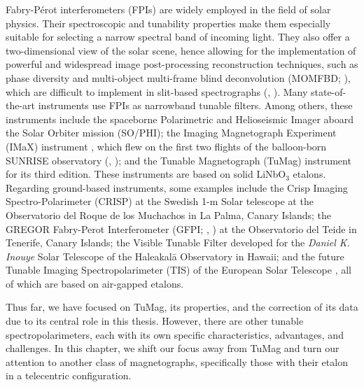 

Fabry-Pérot interferometers (FPIs) are widely employed in the field of solar physics. Their spectroscopic and tunability properties make them especially suitable for selecting a narrow spectral band of incoming light. They also offer a two-dimensional view of the solar scene, hence allowing for the implementation of powerful and widespread image post-processing reconstruction techniques, such as phase diversity \citep{PD_etalon} and multi-object multi-frame blind deconvolution (MOMFBD; \citealt{mombfd}), which are difficult to implement in slit-based spectrographs (\citealt{image_spectro}, \citealt{image_spectro_2}). Many state-of-the-art instruments use FPIs as narrowband tunable filters. Among others, these instruments include the spaceborne Polarimetric and Helioseismic Imager \citep[][]{PHI} aboard the Solar Orbiter mission \citep[][]{SO} (SO/PHI); the Imaging Magnetograph Experiment (IMaX) instrument \citep[][]{IMaX}, which flew on the first two flights of the balloon-born SUNRISE observatory (\citealt{SunriseI}, \citealt{SunriseII}); and the Tunable Magnetograph (TuMag) instrument for its third edition. These instruments are based on solid LiNbO$_3$ etalons. Regarding ground-based instruments, some examples include the Crisp Imaging Spectro-Polarimeter (CRISP) at the Swedish 1-m Solar telescope \citep[][]{crisp} at the Observatorio del Roque de los Muchachos in La Palma, Canary Islands; the GREGOR Fabry-Perot Interferometer (GFPI; \citealt{GFPI}, \citealt{GREGOR}) at the Observatorio del Teide in Tenerife, Canary Islands; the Visible Tunable Filter \citep[VTF;][]{VTF} developed for the \textit{Daniel K. Inouye} Solar Telescope \citep[DKIST;][]{DKIST} of the Haleakal\=a Observatory in Hawaii; and the future Tunable Imaging Spectropolarimeter (TIS) of the European Solar Telescope \citep{EST}, all of which are based on air-gapped etalons. 

Thus far, we have focused on TuMag, its properties, and the correction of its data due to its central role in this thesis. However, there are other tunable spectropolarimeters, each with its own specific characteristics, advantages, and challenges. In this chapter, we shift our focus away from TuMag and turn our attention to another class of magnetographs, specifically those with their etalon in a telecentric configuration.

